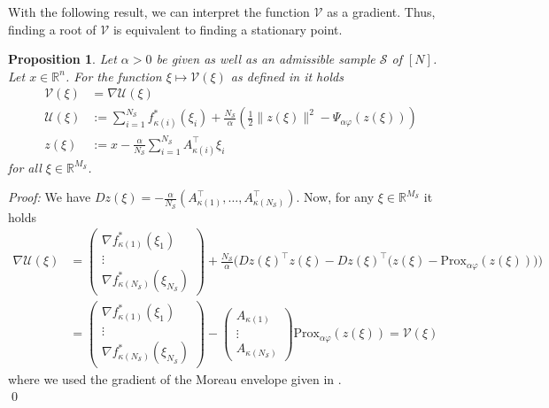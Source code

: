 \documentclass[12pt,a4paper,twoside]{article}
\makeatletter
\renewcommand*{\eqref}[1]{%
	\hyperref[{#1}]{\textup{\tagform@{\ref*{#1}}}}%
}
\theoremstyle{plain}
\newtheorem{prop}[thm]{Proposition}
\theoremstyle{note}
\numberwithin{thm}{section}
\newcommand{\trp}[1]{#1^{\intercal}}
\newcommand{\prox}[2]{\text{Prox}_{#1}\left(#2\right)}
\newcommand{\onehalf}{\frac{1}{2}}
\newcommand{\ixmap}[1]{{\kappa(#1)}}
\let\temp\phi
\let\phi\varphi
\let\varphi\temp
\makeatother
\begin{document}
	\vspace{5mm}
	With the following result, we can interpret the function $\mathcal{V}$ as a gradient. Thus, finding a root of $\mathcal{V}$ is equivalent to finding a stationary point.\\
	\begin{prop}
		\label{prop:derive_U}
		Let $\alpha >0$ be given as well as an admissible sample $\mathcal{S}$ of $[N]$. Let $x \in \mathbb{R}^n$. For the function $\xi \mapsto \mathcal{V}(\xi)$ as defined in \eqref{eqn:definition_V} it holds
		\begin{align*}
			\mathcal{V}(\xi) &= \nabla \mathcal{U}(\xi) \\
			\mathcal{U}(\xi) &:= \sum_{i=1}^{N_\mathcal{S}} f_\ixmap{i}^\ast(\xi_i) + \frac{N_\mathcal{S}}{\alpha} \left(\onehalf \|z(\xi)\|^2 - \Psi_{\alpha \phi}(z(\xi))\right) \\
			z(\xi) &:= x - \frac{\alpha}{N_\mathcal{S}} \sum_{i=1}^{N_{\mathcal{S}}} A_\ixmap{i}^\intercal \xi_i
		\end{align*}
		for all $\xi \in \mathbb{R}^{M_\mathcal{S}}$.
	\end{prop}
	\textit{Proof:} We have $Dz(\xi) = -\frac{\alpha}{N_\mathcal{S}}\left(
	\trp{A_\ixmap{1}} , \dots, \trp{A_\ixmap{N_{\mathcal{S}}}}\right)$.
	Now, for any $\xi \in \mathbb{R}^{M_\mathcal{S}}$ it holds
	\begin{align*}
		\nabla \mathcal{U}(\xi) &= 
		\begin{pmatrix}\nabla f_\ixmap{1}^\ast(\xi_1) \\ \vdots \\\nabla f_\ixmap{{N_\mathcal{S}}}^\ast(\xi_{N_\mathcal{S}})\end{pmatrix} + \frac{N_\mathcal{S}}{\alpha} \Big(\trp{Dz(\xi)}z(\xi) - \trp{Dz(\xi)}\big(z(\xi) - \prox{\alpha \phi}{z(\xi)}\big) \Big) \\
		&= \begin{pmatrix}\nabla f_\ixmap{1}^\ast(\xi_1) \\ \vdots \\\nabla f_\ixmap{{N_\mathcal{S}}}^\ast(\xi_{N_\mathcal{S}})\end{pmatrix} - 
		\begin{pmatrix}
		A_\ixmap{1} \\ \vdots \\ A_\ixmap{N_{\mathcal{S}}}
		\end{pmatrix} \prox{\alpha \phi}{z(\xi)} = \mathcal{V}(\xi)
	\end{align*}
	where we used the gradient of the Moreau envelope given in \eqref{eqn:moreau_gradient}.\\
	\qed
		
\end{document}
